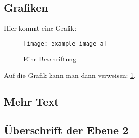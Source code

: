 \documentclass[]{cidarticle}
\begin{document}
\subsection{Grafiken}
Hier kommt eine Grafik:
\begin{figure}
   \texttt{[image: example-image-a]}
   \caption{Eine Beschriftung}
   \label{fig:Beispielgrafik}
\end{figure}

Auf die Grafik kann man dann verweisen: \cref{fig:Beispielgrafik}.

\subsection{Mehr Text}
\blindtext[18]

\subsection{Überschrift der Ebene 2}
\blindtext[5]

\printbibliography
\end{document}
